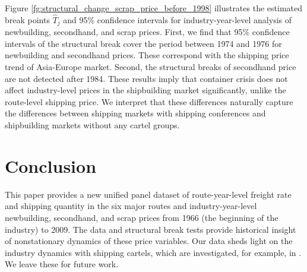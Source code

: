 \documentclass[11pt]{article}
\begin{document}
Figure \ref{fg:structural_change_scrap_price_before_1998} illustrates the estimated break points $\hat{T}_j$ and 95\% confidence intervals for industry-year-level analysis of newbuilding, secondhand, and scrap prices. First, we find that 95\% confidence intervals of the structural break cover the period between 1974 and 1976 for newbuilding and secondhand prices. These correspond with the shipping price trend of Asia-Europe market. Second, the structural breaks of secondhand price are not detected after 1984. These results imply that container crisis does not affect industry-level prices in the shipbuilding market significantly, unlike the route-level shipping price. We interpret that these differences naturally capture the differences between shipping markets with shipping conferences and shipbuilding markets without any cartel groups.


\section{Conclusion}\label{sec:conclusion}
This paper provides a new unified panel dataset of route-year-level freight rate and shipping quantity in the six major routes and industry-year-level newbuilding, secondhand, and scrap prices from 1966 (the beginning of the industry) to 2009. The data and structural break tests provide historical insight of nonstationary dynamics of these price variables. Our data sheds light on the industry dynamics with shipping cartels, which are investigated, for example, in \cite{matsuda2022disentangling}. We leave these for future work. 


\appendix

% 
% 


\newpage


\end{document}
